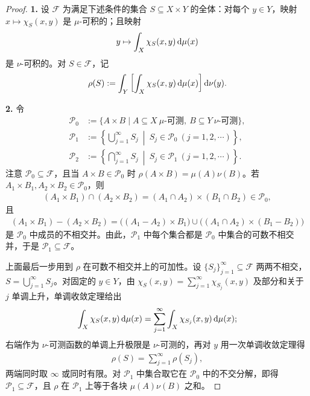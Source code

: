\documentclass[../../main.tex]{subfiles}%
\begin{document}
\begin{proof}
\textbf{1.} 设 $\mathcal{F}$ 为满足下述条件的集合 $S\subseteq X\times Y$ 的全体：对每个 $y\in Y$，映射 $x\mapsto\chi_S(x,y)$ 是 $\mu$-可积的；且映射
\begin{align*}
y\mapsto\int_X\chi_S(x,y)\,\mathrm{d}\mu(x)
\end{align*}
是 $\nu$-可积的。对 $S\in\mathcal{F}$，记
\begin{align*}
\rho(S):=\int_Y\left[\int_X\chi_S(x,y)\,\mathrm{d}\mu(x)\right]\mathrm{d}\nu(y).
\end{align*}

\textbf{2.} 令
\begin{align*}
\mathcal{P}_0&:=\{A\times B\mid A\subseteq X\ \mu\text{-可测},\ B\subseteq Y\ \nu\text{-可测}\},\\
\mathcal{P}_1&:=\left\{\bigcup_{j=1}^{\infty}S_j\ \middle|\ S_j\in\mathcal{P}_0\ (j=1,2,\cdots)\right\},\\
\mathcal{P}_2&:=\left\{\bigcap_{j=1}^{\infty}S_j\ \middle|\ S_j\in\mathcal{P}_1\ (j=1,2,\cdots)\right\}.
\end{align*}
注意 $\mathcal{P}_0\subseteq\mathcal{F}$，且当 $A\times B\in\mathcal{P}_0$ 时 $\rho(A\times B)=\mu(A)\nu(B)$。若 $A_1\times B_1,A_2\times B_2\in\mathcal{P}_0$，则
\begin{align*}
(A_1\times B_1)\cap(A_2\times B_2)=(A_1\cap A_2)\times(B_1\cap B_2)\in\mathcal{P}_0,
\end{align*}
且
\begin{align*}
(A_1\times B_1)-(A_2\times B_2)=\bigl((A_1-A_2)\times B_1\bigr)\cup\bigl((A_1\cap A_2)\times(B_1-B_2)\bigr)
\end{align*}
是 $\mathcal{P}_0$ 中成员的不相交并。由此，$\mathcal{P}_1$ 中每个集合都是 $\mathcal{P}_0$ 中集合的可数不相交并，于是 $\mathcal{P}_1\subseteq\mathcal{F}$。

上面最后一步用到 $\rho$ 在可数不相交并上的可加性。设 $\{S_j\}_{j=1}^{\infty}\subseteq\mathcal{F}$ 两两不相交，$S=\bigcup_{j=1}^{\infty}S_j$。对固定的 $y\in Y$，由 $\chi_S(x,y)=\sum_{j=1}^{\infty}\chi_{S_j}(x,y)$ 及部分和关于 $j$ 单调上升，单调收敛定理给出
\begin{align*}
\int_X\chi_S(x,y)\,\mathrm{d}\mu(x)=\sum_{j=1}^{\infty}\int_X\chi_{S_j}(x,y)\,\mathrm{d}\mu(x);
\end{align*}
右端作为 $\nu$-可测函数的单调上升极限是 $\nu$-可测的，再对 $y$ 用一次单调收敛定理得
\begin{align*}
\rho(S)=\sum_{j=1}^{\infty}\rho(S_j),
\end{align*}
两端同时取 $\infty$ 或同时有限。对 $\mathcal{P}_1$ 中集合取它在 $\mathcal{P}_0$ 中的不交分解，即得 $\mathcal{P}_1\subseteq\mathcal{F}$，且 $\rho$ 在 $\mathcal{P}_1$ 上等于各块 $\mu(A)\nu(B)$ 之和。


\end{proof}
\end{document}
